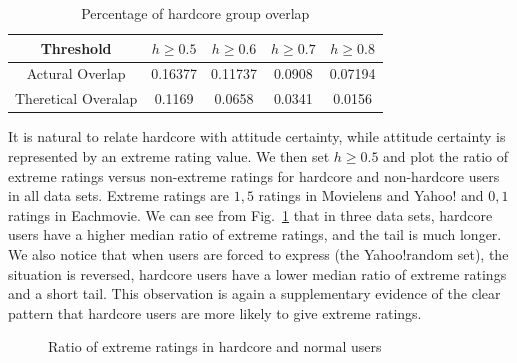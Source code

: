 \documentclass[sigconf]{acmart}
\begin{document}
\begin{table}[htbp]
\centering
\caption{Percentage of hardcore group overlap}\label{tab:overlap}
\centering
\begin{tabular}{|c|c|c|c|c|}
\hline
 Threshold & $h\geq 0.5$ & $h\geq 0.6$ & $h \geq 0.7$ & $h\geq 0.8$ \\\hline\hline
Actural Overlap& 0.16377 &	0.11737 &	0.0908 & 0.07194 \\\hline
Theretical Overalap & 0.1169 &  0.0658 &  0.0341 & 0.0156\\
\hline
\end{tabular}
\end{table}

It is natural to relate hardcore with attitude certainty, while attitude certainty is represented by an extreme rating value. We then set $h\geq 0.5$ and plot the ratio of extreme ratings versus non-extreme ratings for hardcore and non-hardcore users in all data sets. Extreme ratings are $1,5$ ratings in Movielens and Yahoo! and $0,1$ ratings in Eachmovie. We can see from Fig.~\ref{fig:hardcore} that in three data sets, hardcore users have a higher median ratio of extreme ratings, and the tail is much longer. We also notice that when users are forced to express (the Yahoo!random set), the situation is reversed, hardcore users have a lower median ratio of extreme ratings and a short tail.  This observation is again a supplementary evidence of the clear pattern that hardcore users are more likely to give extreme ratings.

\begin{figure}[htbp]
\centering
\centering
{}
\caption{Ratio of extreme ratings in hardcore and normal users}
\label{fig:hardcore}
\end{figure}
\end{document}
